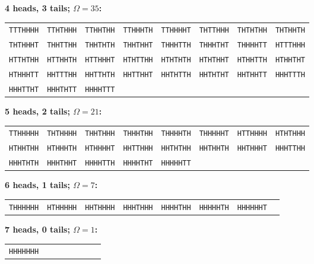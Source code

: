 \noindent\textbf{4 heads, 3 tails; $\Omega=35$:}\par\smallskip
\begin{tabular}{@{}llllllll@{}}
\texttt{TTTHHHH} & \texttt{TTHTHHH} & \texttt{TTHHTHH} & \texttt{TTHHHTH} & \texttt{TTHHHHT} & \texttt{THTTHHH} & \texttt{THTHTHH} & \texttt{THTHHTH} \\
\texttt{THTHHHT} & \texttt{THHTTHH} & \texttt{THHTHTH} & \texttt{THHTHHT} & \texttt{THHHTTH} & \texttt{THHHTHT} & \texttt{THHHHTT} & \texttt{HTTTHHH} \\
\texttt{HTTHTHH} & \texttt{HTTHHTH} & \texttt{HTTHHHT} & \texttt{HTHTTHH} & \texttt{HTHTHTH} & \texttt{HTHTHHT} & \texttt{HTHHTTH} & \texttt{HTHHTHT} \\
\texttt{HTHHHTT} & \texttt{HHTTTHH} & \texttt{HHTTHTH} & \texttt{HHTTHHT} & \texttt{HHTHTTH} & \texttt{HHTHTHT} & \texttt{HHTHHTT} & \texttt{HHHTTTH} \\
\texttt{HHHTTHT} & \texttt{HHHTHTT} & \texttt{HHHHTTT} \\
\end{tabular}\par\medskip
\noindent\textbf{5 heads, 2 tails; $\Omega=21$:}\par\smallskip
\begin{tabular}{@{}llllllll@{}}
\texttt{TTHHHHH} & \texttt{THTHHHH} & \texttt{THHTHHH} & \texttt{THHHTHH} & \texttt{THHHHTH} & \texttt{THHHHHT} & \texttt{HTTHHHH} & \texttt{HTHTHHH} \\
\texttt{HTHHTHH} & \texttt{HTHHHTH} & \texttt{HTHHHHT} & \texttt{HHTTHHH} & \texttt{HHTHTHH} & \texttt{HHTHHTH} & \texttt{HHTHHHT} & \texttt{HHHTTHH} \\
\texttt{HHHTHTH} & \texttt{HHHTHHT} & \texttt{HHHHTTH} & \texttt{HHHHTHT} & \texttt{HHHHHTT} \\
\end{tabular}\par\medskip
\noindent\textbf{6 heads, 1 tails; $\Omega=7$:}\par\smallskip
\begin{tabular}{@{}llllllll@{}}
\texttt{THHHHHH} & \texttt{HTHHHHH} & \texttt{HHTHHHH} & \texttt{HHHTHHH} & \texttt{HHHHTHH} & \texttt{HHHHHTH} & \texttt{HHHHHHT} \\
\end{tabular}\par\medskip
\noindent\textbf{7 heads, 0 tails; $\Omega=1$:}\par\smallskip
\begin{tabular}{@{}llllllll@{}}
\texttt{HHHHHHH} \\
\end{tabular}\par\medskip
